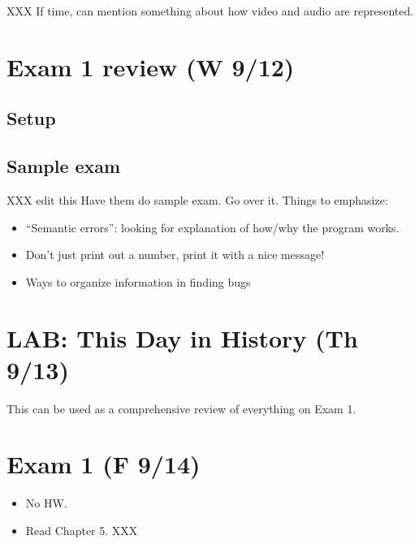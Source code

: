 \documentclass{article}
\newenvironment{reflect}[1]
{
  \noindent
  \begin{lrbox}{\reflectbox}
    \begin{minipage}[t]{\textwidth}
      \textbf{#1}:
}{
    \end{minipage}
  \end{lrbox}
  \fbox{\usebox{\reflectbox}}
}
\begin{document}
XXX If time, can mention something about how video and audio are
represented.

\newpage
\section{Exam 1 review (W 9/12)}

\subsection*{Setup}

\subsection*{Sample exam}

XXX edit this
Have them do sample exam. Go over it.  Things to emphasize:
\begin{itemize}
\item ``Semantic errors'': looking for explanation of how/why the
  program works.
\item Don't just print out a number, print it with a nice message!
\item Ways to organize information in finding bugs
\end{itemize}

\newpage
\section*{LAB: This Day in History (Th 9/13)}

This can be used as a comprehensive review of everything on Exam 1.

\newpage
\section{Exam 1 (F 9/14)}

\begin{itemize}
\item No HW.
\item Read Chapter 5. XXX
\end{itemize}


\end{document}
